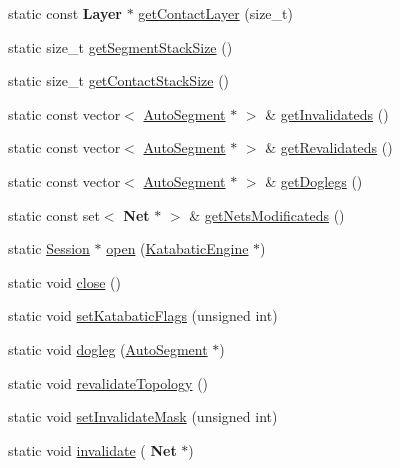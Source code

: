 \begin{DoxyCompactItemize}
\item 
static const \textbf{ Layer} $\ast$ \hyperlink{classKatabatic_1_1Session_ad3ee60a34f480bd3aecd8c7d957ff52e}{get\+Contact\+Layer} (size\+\_\+t)
\item 
static size\+\_\+t \hyperlink{classKatabatic_1_1Session_ac9c144a8faf97714069824933970923c}{get\+Segment\+Stack\+Size} ()
\item 
static size\+\_\+t \hyperlink{classKatabatic_1_1Session_a0d0c0159030a32b78ab4ad2b58871bce}{get\+Contact\+Stack\+Size} ()
\item 
static const vector$<$ \hyperlink{classKatabatic_1_1AutoSegment}{Auto\+Segment} $\ast$ $>$ \& \hyperlink{classKatabatic_1_1Session_a6060b7e972f3c0d10cfa158b5ed174e6}{get\+Invalidateds} ()
\item 
static const vector$<$ \hyperlink{classKatabatic_1_1AutoSegment}{Auto\+Segment} $\ast$ $>$ \& \hyperlink{classKatabatic_1_1Session_af5675d50557db83d11b7d2151de5f34c}{get\+Revalidateds} ()
\item 
static const vector$<$ \hyperlink{classKatabatic_1_1AutoSegment}{Auto\+Segment} $\ast$ $>$ \& \hyperlink{classKatabatic_1_1Session_a84211b77fe7fb8b49a93d7f298a5de90}{get\+Doglegs} ()
\item 
static const set$<$ \textbf{ Net} $\ast$ $>$ \& \hyperlink{classKatabatic_1_1Session_a6c3be93d98029b06138f633342d04157}{get\+Nets\+Modificateds} ()
\item 
static \hyperlink{classKatabatic_1_1Session}{Session} $\ast$ \hyperlink{classKatabatic_1_1Session_a000e098850f6cccff6b289a294149a41}{open} (\hyperlink{classKatabatic_1_1KatabaticEngine}{Katabatic\+Engine} $\ast$)
\item 
static void \hyperlink{classKatabatic_1_1Session_a5ae591df94fc66ccb85cbb6565368bca}{close} ()
\item 
static void \hyperlink{classKatabatic_1_1Session_af9919aefa1db2478b3d1813c1872d175}{set\+Katabatic\+Flags} (unsigned int)
\item 
static void \hyperlink{classKatabatic_1_1Session_aed01e83f7d8dc7acd85156256a9e776c}{dogleg} (\hyperlink{classKatabatic_1_1AutoSegment}{Auto\+Segment} $\ast$)
\item 
static void \hyperlink{classKatabatic_1_1Session_a69fc41ca90fae86766ae9d528394868f}{revalidate\+Topology} ()
\item 
static void \hyperlink{classKatabatic_1_1Session_a16f4761496e07b9e836642d1effa1993}{set\+Invalidate\+Mask} (unsigned int)
\item 
static void \hyperlink{classKatabatic_1_1Session_ae310a7c2c301b7e5f90fba5d34cc5be9}{invalidate} (\textbf{ Net} $\ast$)

\end{DoxyCompactItemize}
